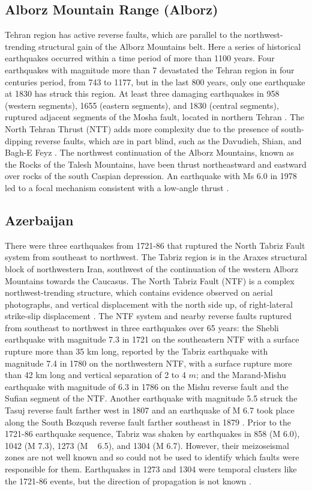 \documentclass{article}
\begin{document}
\subsection{Alborz Mountain Range (Alborz)}
Tehran region has active reverse faults, which are parallel to the northwest-trending structural gain of the Alborz Mountains belt. Here a series of historical earthquakes occurred within a time period of more than 1100 years. Four earthquakes with magnitude more than 7 devastated the Tehran region in four centuries period, from 743 to 1177, but in the last 800 years, only one earthquake at 1830 has struck this region. At least three damaging earthquakes in 958 (western segments), 1655 (eastern segments), and 1830 (central segments), ruptured adjacent segments of the Mosha fault, located in northern Tehran \citep{Berberian1999}.
The North Tehran Thrust (NTT) adds more complexity due to the presence of south-dipping reverse faults, which are in part blind, such as the Davudieh, Shian, and Bagh-E Feyz \citep{Berberian1999}.
The northwest continuation of the Alborz Mountains, known as the Rocks of the Talesh Mountains, have been thrust northeastward and eastward over rocks of the south Caspian depression. An earthquake with Ms 6.0 in 1978 led to a focal mechanism consistent with a low-angle thrust \citep{Berberian1999}.



\subsection{Azerbaijan}
There were three earthquakes from 1721-86 that ruptured the North Tabriz Fault system from southeast to northwest. The Tabriz region is in the Araxes structural block of northwestern Iran, southwest of the continuation of the western Alborz Mountains towards the Caucasus. The North Tabriz Fault (NTF) is a complex northwest-trending structure, which contains evidence observed on aerial photographs, and vertical displacement with the north side up, of right-lateral strike-slip displacement \citep{Berberian1999}.
The NTF system and nearby reverse faults ruptured from southeast to northwest in three earthquakes over 65 years: the Shebli earthquake with magnitude 7.3 in 1721 on the southeastern NTF with a surface rupture more than 35 km long, reported by \citet{Jones1834} the Tabriz earthquake with magnitude 7.4 in 1780 on the northwestern NTF, with a surface rupture more than 42 km long and vertical separation of 2 to 4 $m$; and the Marand-Mishu earthquake with magnitude of 6.3 in 1786 on the Mishu reverse fault and the Sufian segment of the NTF. Another earthquake with  magnitude 5.5 struck the Tasuj reverse fault farther west in 1807 and an earthquake of M 6.7 took place along the South Bozqush reverse fault farther southeast in 1879 \citep{Berberian1999}.
Prior to the 1721-86 earthquake sequence, Tabriz was shaken by earthquakes in 858 (M 6.0), 1042 (M 7.3), 1273 (M ~ 6.5), and 1304 (M 6.7). However, their meizoseismal zones are not well known and so could not be used to identify which faults were responsible for them. Earthquakes in 1273 and 1304 were temporal clusters like the 1721-86 events, but the direction of propagation is not known \citep{Berberian1997, Berberian1999}.
\end{document}

